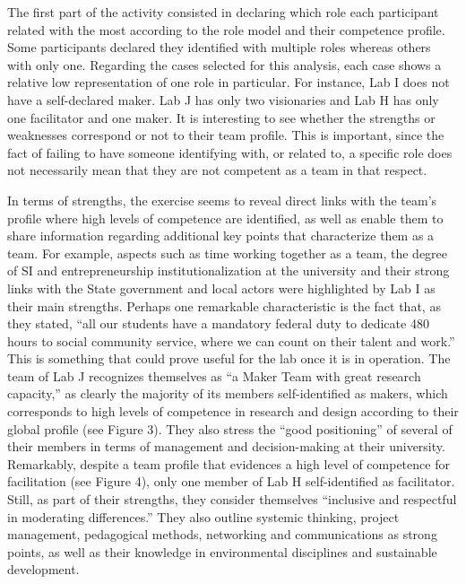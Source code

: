 \documentclass[AMA,STIX1COL,APA,STIX2COL]{WileyNJD-v2}
\begin{document}
The first part of the activity consisted in declaring which role each
participant related with the most according to the role model and their
competence profile. Some participants declared they identified with
multiple roles whereas others with only one. Regarding the cases
selected for this analysis, each case shows a relative low
representation of one role in particular. For instance, Lab I does not
have a self-declared maker. Lab J has only two visionaries and Lab H has
only one facilitator and one maker. It is interesting to see whether the
strengths or weaknesses correspond or not to their team profile. This is
important, since the fact of failing to have someone identifying with,
or related to, a specific role does not necessarily mean that they are
not competent as a team in that respect.

In terms of strengths, the exercise seems to reveal direct links with
the team's profile where high levels of competence are identified, as
well as enable them to share information regarding additional key points
that characterize them as a team. For example, aspects such as time
working together as a team, the degree of SI and entrepreneurship
institutionalization at the university and their strong links with the
State government and local actors were highlighted by Lab I as their
main strengths. Perhaps one remarkable characteristic is the fact that,
as they stated, ``all our students have a mandatory federal duty to
dedicate 480 hours to social community service, where we can count on
their talent and work.'' This is something that could prove useful for
the lab once it is in operation. The team of Lab J recognizes themselves
as ``a Maker Team with great research capacity,'' as clearly the
majority of its members self-identified as makers, which corresponds to
high levels of competence in research and design according to their
global profile (see Figure 3). They also stress the ``good positioning''
of several of their members in terms of management and decision-making
at their university. Remarkably, despite a team profile that evidences a
high level of competence for facilitation (see Figure 4), only one
member of Lab H self-identified as facilitator. Still, as part of their
strengths, they consider themselves ``inclusive and respectful in
moderating differences.'' They also outline systemic thinking, project
management, pedagogical methods, networking and communications as strong
points, as well as their knowledge in environmental disciplines and
sustainable development.
\end{document}

